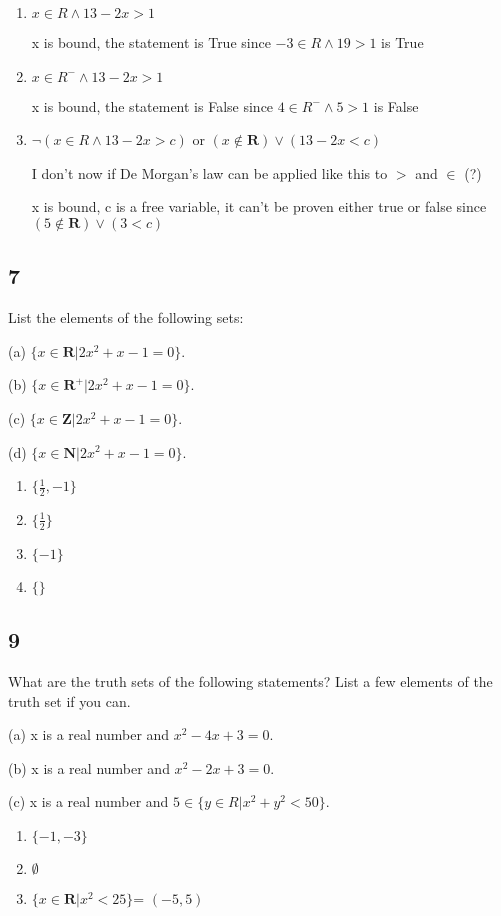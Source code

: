 \documentclass{article}
\begin{document}
\begin{enumerate}[label=(\alph*)]
    \item 
    $ x \in R \land 13-2x > 1$  
    
    x is bound, the statement is True since $ -3 \in R \land 19 > 1$ is True
    \item
    $ x \in R^-\land 13-2x> 1$
    
    x is bound, the statement is False since $ 4 \in R^-\land 5> 1$ is False
    \item
    $ \neg (x \in R \land 13-2x > c)$ or $( x \notin \mathbf{R} )\lor (13 - 2x < c)$
    
    I don't now if De Morgan's law can be applied like this to $>$ and $\in$ (?)
    
    x is bound, c is a free variable, it can't be proven either true or false since $( 5 \notin \mathbf{R} )\lor (3 < c)$
\end{enumerate}
\subsection{7}
List the elements of the following sets:

(a) $\{x \in \mathbf{R} \vert 2x^2 + x - 1 = 0\}$.

(b) $\{x \in \mathbf{R^+}\vert 2x^2 + x - 1 = 0\}$.

(c) $\{x \in \mathbf{Z} \vert 2x^2 + x - 1 = 0\}$.

(d) $\{x \in \mathbf{N} \vert 2x^2 + x - 1 = 0\}$.

\begin{enumerate}[label=(\alph*)]
    \item 
    $\{ \frac{1}{2}, -1\}$
    \item
    $\{ \frac{1}{2}\}$
    \item
    $\{-1\}$
    \item
    $\{\}$
\end{enumerate}
\subsection{9}
What are the truth sets of the following statements? List a few
elements of the truth set if you can.

(a) x is a real number and $x^2- 4 x + 3 = 0$.

(b) x is a real number and $x^2- 2 x + 3 = 0$.

(c) x is a real number and $5 \in \{y \in R \vert x^2 + y^2< 50\}$.
\begin{enumerate}[label=(\alph*)]
    \item 
    $\{-1,-3\}$
    \item
    $\emptyset$ 
    \item
    $\{x \in \mathbf{R} \vert {x^2}<25\}$= $(-5,5)$ 
\end{enumerate}
\end{document}
